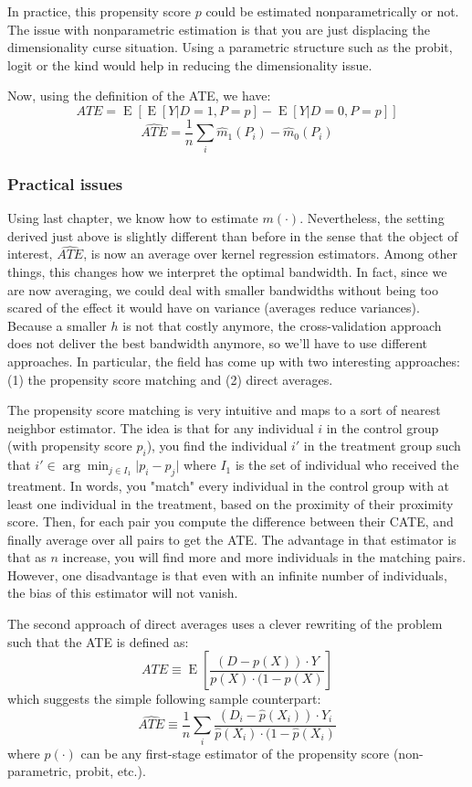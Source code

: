 \documentclass[12pt]{report}
\newcommand{\E}[1]{\operatorname{E}\left[#1\right]}
\begin{document}
In practice, this propensity score $p$ could be estimated nonparametrically or not. The issue with nonparametric estimation is that you are just displacing the dimensionality curse situation. Using a parametric structure such as the probit, logit or the kind would help in reducing the dimensionality issue.

Now, using the definition of the ATE, we have: $$ATE = \E{\E{Y \vert D=1, P=p} - \E{Y\vert D=0, P=p}}$$ $$\widehat{ATE} = \frac{1}{n} \sum_i \hat m_1(P_i) - \hat m_0(P_i) $$

\subsubsection{Practical issues}

Using last chapter, we know how to estimate $m(\cdot)$. Nevertheless, the setting derived just above is slightly different than before in the sense that the object of interest, $\widehat{ATE}$, is now an average over kernel regression estimators. Among other things, this changes how we interpret the optimal bandwidth. In fact, since we are now averaging, we could deal with smaller bandwidths without being too scared of the effect it would have on variance (averages reduce variances). Because a smaller $h$ is not that costly anymore, the cross-validation approach does not deliver the best bandwidth anymore, so we'll have to use different approaches. In particular, the field has come up with two interesting approaches: (1) the propensity score matching and (2) direct averages.

The propensity score matching is very intuitive and maps to a sort of nearest neighbor estimator. The idea is that for any individual $i$ in the control group (with propensity score $p_i$), you find the individual $i'$ in the treatment group such that $i'\in\arg\min_{j\in I_1} \vert p_i - p_j\vert$ where $I_1$ is the set of individual who received the treatment. In words, you "match" every individual in the control group with at least one individual in the treatment, based on the proximity of their proximity score. Then, for each pair you compute the difference between their CATE, and finally average over all pairs to get the ATE. The advantage in that estimator is that as $n$ increase, you will find more and more individuals in the matching pairs. However, one disadvantage is that even with an infinite number of individuals, the bias of this estimator will not vanish.

The second approach of direct averages uses a clever rewriting of the problem such that the ATE is defined as: $$ATE \equiv \E{\frac{(D - p(X))\cdot Y}{p(X)\cdot (1 - p(X)}} $$ which suggests the simple following sample counterpart: $$\widehat{ATE} \equiv \frac{1}{n}\sum_{i} \frac{(D_i - \hat p(X_i))\cdot Y_i}{\hat p(X_i)\cdot (1 - \hat p(X_i)} $$ where $\hat p(\cdot)$ can be any first-stage estimator of the propensity score (non-parametric, probit, etc.).
\end{document}
